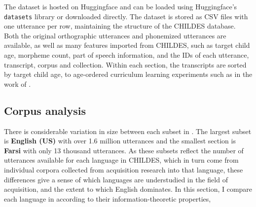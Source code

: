 The dataset is hosted on Huggingface and can be loaded using Huggingface's \texttt{datasets} library \citep{lhoest-etal-2021-datasets} or downloaded directly. The dataset is stored as CSV files with one utterance per row, maintaining the structure of the CHILDES database. Both the original orthographic utterances and phonemized utterances are available, as well as many features imported from CHILDES, such as target child age, morpheme count, part of speech information, and the IDs of each utterance, transcript, corpus and collection. Within each section, the transcripts are sorted by target child age, to age-ordered curriculum learning experiments such as in the work of \citet{huebner-etal-2021-babyberta}.

\subsection{Corpus analysis}
\label{sec:dataset-phonemized-childes-analysis}

There is considerable variation in size between each subset in \phonemizedchildes. The largest subset is \textbf{English (US)} with over 1.6 million utterances and the smallest section is \textbf{Farsi} with only 13 thousand utterances. As these subsets reflect the number of utterances available for each language in CHILDES, which in turn come from individual corpora collected from acquisition research into that language, these differences give a sense of which languages are understudied in the field of acquisition, and the extent to which English dominates. In this section, I compare each language in \phonemizedchildes according to their information-theoretic properties,   


